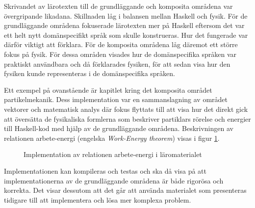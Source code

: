 Skrivandet av lärotexten till de grundläggande och komposita områdena var
övergripande likadana. Skillnaden låg i balansen mellan Haskell och fysik. För
de grundläggande områdena fokuserade lärotexten mer på Haskell eftersom det var
ett helt nytt domänspecifikt språk som skulle konstrueras. Hur det fungerade var
därför viktigt att förklara. För de komposita områdena låg däremot ett större fokus på fysik. För dessa områden visades hur de
domänspecifika språken var praktiskt användbara och då förklarades fysiken, för
att sedan visa hur den fysiken kunde representeras i de domänspecifika
språken.

Ett exempel på ovanstående är kapitlet kring det komposita området partikelmekanik. Dess implementation var en sammanslagning av området vektorer och
matematisk analys där fokus flyttats till att visa hur det direkt gick att översätta de
fysikaliska formlerna som beskriver partiklars rörelse och energier till
Haskell-kod med hjälp av de grundläggande områdena. Beskrivningen av relationen arbete-energi (engelska \textit{Work-Energy theorem}) visas i figur \ref{fig:komposit-ex}.

\begin{figure}[tph]
  \centering
  \caption{Implementation av relationen arbete-energi i läromaterialet}
  \label{fig:komposit-ex}
\end{figure}

Implementationen kan kompileras och testas och ska då visa på att
implementationerna av de grundläggande områdena är både rigorösa och korrekta.
Det visar dessutom att det går att använda materialet som presenteras tidigare
till att implementera och lösa mer komplexa problem.

